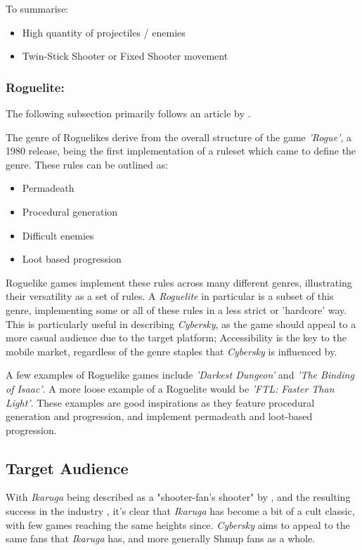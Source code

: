 \documentclass{scrartcl}
\let\cite\textcite
\let\citep\autocite
\begin{document}
To summarise:

\begin{itemize}
  \item High quantity of projectiles / enemies
  \item Twin-Stick Shooter or Fixed Shooter movement
\end{itemize}

\subsubsection{Roguelite:}

The following subsection primarily follows an article by \cite{BrianW2020-02}.

The genre of Roguelikes derive from the overall structure of the game \emph{'Rogue'}, a 1980 release, being the first implementation of a ruleset which came to define the genre. These rules can be outlined as:

\begin{itemize}
  \item Permadeath
  \item Procedural generation
  \item Difficult enemies
  \item Loot based progression
\end{itemize}

Roguelike games implement these rules across many different genres, illustrating their versatility as a set of rules. A \emph{Roguelite} in particular is a subset of this genre, implementing some or all of these rules in a less strict or 'hardcore' way. This is particularly useful in describing \emph{Cybersky}, as the game should appeal to a more casual audience due to the target platform; Accessibility is the key to the mobile market, regardless of the genre staples that \emph{Cybersky} is influenced by.

A few examples of Roguelike games include \emph{'Darkest Dungeon'} and \emph{'The Binding of Isaac'}. A more loose example of a Roguelite would be \emph{'FTL: Faster Than Light'}. These examples are good inspirations as they feature procedural generation and progression, and implement permadeath and loot-based progression.

\subsection{Target Audience}

With \emph{Ikaruga} being described as a "shooter-fan's shooter" by \cite{Rodriguez2018}, and the resulting success in the industry \citep{BrianW2020-01}, it's clear that \emph{Ikaruga} has become a bit of a cult classic, with few games reaching the same heights since. \emph{Cybersky} aims to appeal to the same fans that \emph{Ikaruga} has, and more generally Shmup fans as a whole.
\end{document}
